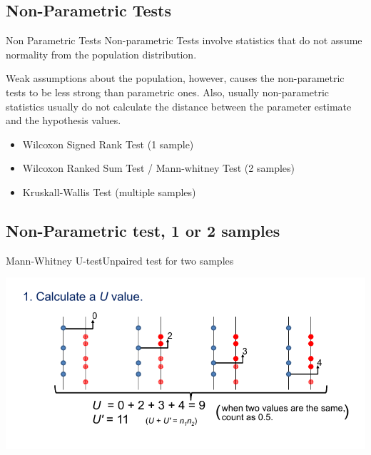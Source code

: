 \subsection{Non-Parametric Tests}

\begin{frame}{Non Parametric Tests}{}
  Non-parametric Tests involve statistics that do not assume normality from the population distribution.\bigskip

  Weak assumptions about the population, however, causes the non-parametric tests to be less strong than parametric ones. Also, usually non-parametric statistics usually do not calculate the distance between the parameter estimate and the hypothesis values.
  \bigskip

  \begin{itemize}
    \item Wilcoxon Signed Rank Test (1 sample)
    \item Wilcoxon Ranked Sum Test / Mann-whitney Test (2 samples)
    \item Kruskall-Wallis Test (multiple samples)
  \end{itemize}
\end{frame}


\subsection{Non-Parametric test, 1 or 2 samples}


\begin{frame}{Mann-Whitney U-test}{Unpaired test for two samples}
  \begin{center}
    \includegraphics[width=1\textwidth]{../img/MannWhitneyU}
  \end{center}
\end{frame}

